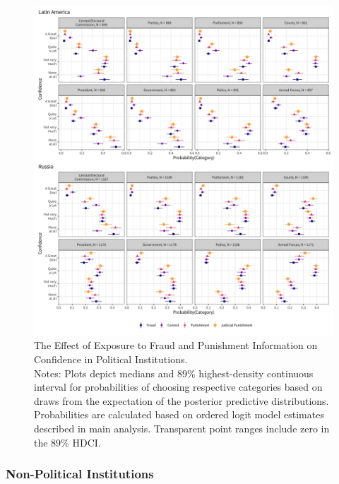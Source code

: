 \documentclass[11pt, ngerman,english,a4]{article}
\begin{document}
\begin{figure}[H]
	\centering
	\includegraphics[width=\linewidth,trim=4 4 4 4,clip]{figs/probs_hdi89_1.png}
	\caption{The Effect of Exposure to Fraud and Punishment Information on Confidence in Political Institutions.  \\
		\footnotesize{Notes: Plots depict medians and 89\% highest-density continuous interval for probabilities of choosing respective categories based on draws from the expectation of the posterior predictive distributions. Probabilities are calculated based on ordered logit model estimates described in main analysis.
			Transparent point ranges include zero in the 89\% HDCI.
	} }
	\singlespacing
	\raggedright
\end{figure}
    
    

\clearpage

\subsubsection*{Non-Political Institutions}
\end{document}
